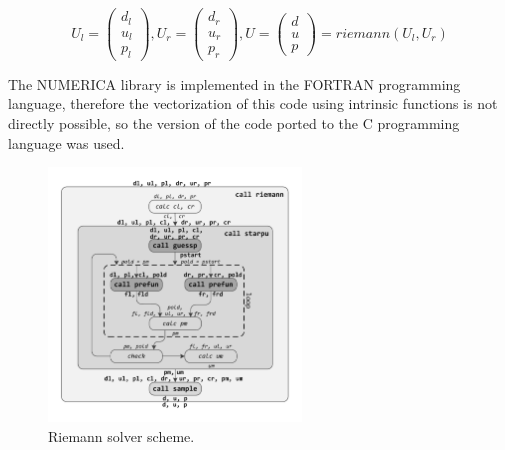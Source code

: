 \documentclass[
11pt,%
tightenlines,%
twoside,%
onecolumn,%
nofloats,%
nobibnotes,%
nofootinbib,%
superscriptaddress,%
noshowpacs,%
centertags]%
{revtex4}
\begin{document}
\begin{equation}\label{eq:riemann}
U_l = \left( \begin{array}{ccc} d_l \\ u_l \\ p_l \end{array} \right),
U_r = \left( \begin{array}{ccc} d_r \\ u_r \\ p_r \end{array} \right),
U = \left( \begin{array}{ccc} d \\ u \\ p \end{array} \right) = riemann(U_l, U_r)
\end{equation}

The NUMERICA library is implemented in the FORTRAN programming language, therefore the vectorization of this code using intrinsic functions is not directly possible, so the version of the code ported to the C programming language was used.

\begin{figure}[h]
\setcaptionmargin{5mm}
\onelinecaptionstrue
\includegraphics[width=0.6\textwidth]{pics/riemann.pdf}
\caption{Riemann solver scheme.}\label{fig:riemann_scheme}
\end{figure}
\end{document}
